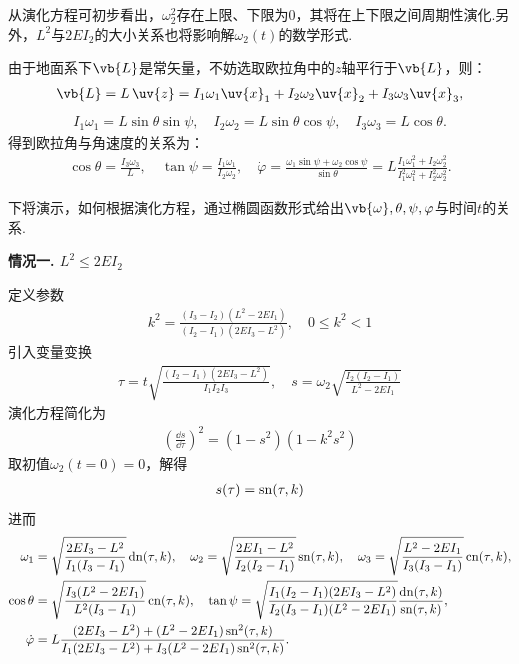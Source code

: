 从演化方程可初步看出，\(\omega_2^2\)存在上限、下限为\(0\)，其将在上下限之间周期性演化.另外，\(L^2\)与\(2EI_2\)的大小关系也将影响解\(\omega_2(t)\)的数学形式.

由于地面系下\(\vb{L}\)是常矢量，不妨选取欧拉角中的\(z\)轴平行于\(\vb{L}\)，则：
\begin{align*}
	\vb{L}=L\,\uv{z}= I_1 \omega_1 \uv{x}_1 + I_2 \omega_2 \uv{x}_2 + I_3 \omega_3 \uv{x}_3 ,
\end{align*}
\begin{align*}
	I_1\omega_1 = L\sin\theta\sin\psi, \quad I_2\omega_2 = L\sin\theta\cos\psi, \quad I_3\omega_3 = L\cos\theta.
\end{align*}
得到欧拉角与角速度的关系为：
\begin{align*}
	\cos\theta = \frac{I_3\omega_3}{L}, \quad \tan\psi = \frac{I_1\omega_1}{I_2\omega_2},\quad \dot{\varphi} = \frac{\omega_1\sin\psi + \omega_2\cos\psi}{\sin\theta} = L \frac{I_1\omega_1^2 + I_2\omega_2^2}{I_1^2\omega_1^2 + I_2^2\omega_2^2}.
\end{align*}

下将演示，如何根据演化方程，通过椭圆函数形式给出\(\vb{\omega},\theta,\psi,\varphi\)与时间\(t\)的关系.

\textbf{情况一.  \(L^2 \leq 2EI_2\)}

定义参数
\begin{align*}
	k^2 = \frac{(I_3-I_2)(L^2-2EI_1)}{(I_2-I_1)(2EI_3-L^2)}, \quad 0 \leq k^2 < 1
\end{align*}
引入变量变换
\begin{align*}
	\tau = t\sqrt{\frac{(I_2-I_1)(2EI_3-L^2)}{I_1I_2I_3}}, \quad
	s = \omega_2\sqrt{\frac{I_2(I_2-I_1)}{L^2-2EI_1}}
\end{align*}
演化方程简化为
\begin{align*}
	\left(\frac{\dd s}{\dd \tau}\right)^2 = (1-s^2)(1-k^2s^2)
\end{align*}
取初值\(\omega_2(t=0)=0\)，解得
\begin{align*}
	s(\tau) = \operatorname{sn}(\tau,k)
\end{align*}
进而
\begin{align*}
	\omega_1      & = \sqrt{\frac{2EI_3-L^2}{I_1(I_3-I_1)}}\operatorname{dn}(\tau,k) ,\quad
	\omega_2=\sqrt{\frac{2EI_1-L^2}{I_2(I_2-I_1)}} \operatorname{sn}(\tau,k),\quad
	\omega_3 = \sqrt{\frac{L^2-2EI_1}{I_3(I_3-I_1)}}\operatorname{cn}(\tau,k),                                               \\
	\cos\theta    & = \sqrt{\frac{I_3(L^2-2EI_1)}{L^2(I_3-I_1)}}\operatorname{cn}(\tau,k),\quad
	\tan\psi = \sqrt{\frac{I_1(I_2-I_1)(2EI_3-L^2)}{I_2(I_3-I_1)(L^2-2EI_1)}}\frac{\operatorname{dn}(\tau,k)}{\operatorname{sn}(\tau,k)},  \\
	\dot{\varphi} & = L \frac{(2EI_3-L^2)+(L^2-2EI_1)\operatorname{sn}^2(\tau,k)}{I_1(2EI_3-L^2)+I_3(L^2-2EI_1)\operatorname{sn}^2(\tau,k)}.
\end{align*}

